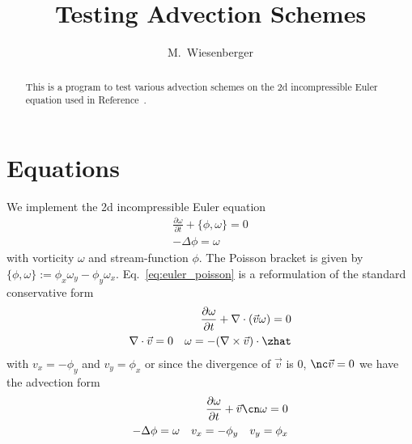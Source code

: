 


\usepackage{minted}



\title{Testing Advection Schemes}
\author{ M.~Wiesenberger}
\maketitle

\begin{abstract}
  This is a program to test various advection schemes on the 2d incompressible Euler
  equation used in Reference~\cite{Einkemmer2014}.
\end{abstract}
\tableofcontents

\section{Equations}
We implement the 2d incompressible Euler equation
\begin{subequations}
\begin{align}
 \frac{\partial \omega}{\partial t} + \{ \phi, \omega\} = 0 \\
 -\Delta \phi = \omega \label{eq:euler_poisson_elliptic}
\end{align}
\label{eq:euler_poisson}
\end{subequations}
with vorticity $\omega$ and stream-function $\phi$.
The Poisson bracket is given by $\{ \phi, \omega\} := \phi_x \omega_y - \phi_y \omega_x$.
Eq.~\eqref{eq:euler_poisson} is a reformulation of the standard conservative form
\begin{subequations}
\begin{align}
    \frac{\partial \omega}{\partial t} + \nabla\cdot({\vec v \omega}) = 0 \\
\nabla\cdot\vec v = 0 \quad \omega = -(\nabla\times \vec v)\cdot \zhat
\end{align}
\label{eq:euler_conservative}
\end{subequations}
with $v_x = - \phi_y$ and $v_y = \phi_x$
or since the divergence of $\vec v$ is $0$, $\nc \vec v = 0$ we have the advection form
\begin{subequations}
\begin{align}
    \frac{\partial \omega}{\partial t} + \vec v\cn \omega = 0 \\
    -\Delta\phi = \omega \quad v_x = -\phi_y \quad v_y = \phi_x
\end{align}
\label{eq:euler_advection}
\end{subequations}

